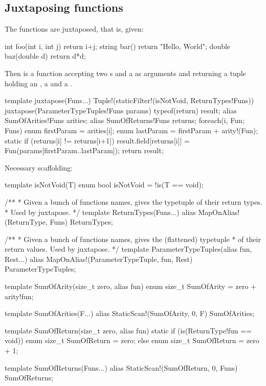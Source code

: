 \subsection{Juxtaposing functions}\label{juxtapose}


The functions are juxtaposed, that is, given:

\begin{dcode}
int foo(int i, int j) { return i+j;}
string bar() { return "Hello, World";}
double baz(double d) { return d*d;}
\end{dcode}

Then  is a function accepting two s and a  as arguments and returning a tuple holding an , a  and a .

\begin{dcode}
template juxtapose(Funs...)
{
    Tuple!(staticFilter!(isNotVoid, ReturnTypes!Funs))
    juxtapose(ParameterTypeTuples!Funs params) 
    {
        typeof(return) result;
        alias SumOfArities!Funs arities;
        alias SumOfReturns!Funs returns;
        foreach(i, Fun; Funs) 
        {
            enum firstParam = arities[i];
            enum lastParam = firstParam + arity!(Fun);
            static if (returns[i] != returns[i+1])
                result.field[returns[i]] = Fun(params[firstParam..lastParam]);
        }
        return result;
    }
}
\end{dcode}

Necessary scaffolding:

\begin{dcode}
template isNotVoid(T)
{
    enum bool isNotVoid = !is(T == void);
}

/** 
 * Given a bunch of functions names, gives the typetuple of their return types.
 * Used by juxtapose.
 */
template ReturnTypes(Funs...)
{
    alias MapOnAlias!(ReturnType, Funs) ReturnTypes;
}

/**
 * Given a bunch of functions names, gives the (flattened) typetuple
 * of their return values. Used by juxtapose.
 */
template ParameterTypeTuples(alias fun, Rest...)
{
    alias MapOnAlias!(ParameterTypeTuple, fun, Rest) ParameterTypeTuples;
}

template SumOfArity(size_t zero, alias fun)
{
    enum size_t SumOfArity = zero + arity!fun;
}

template SumOfArities(F...)
{
    alias StaticScan!(SumOfArity, 0, F) SumOfArities;
}

template SumOfReturn(size_t zero, alias fun)
{
    static if (is(ReturnType!fun == void))
        enum size_t SumOfReturn = zero;
    else
        enum size_t SumOfReturn = zero + 1;
}

template SumOfReturns(Funs...)
{
    alias StaticScan!(SumOfReturn, 0, Funs) SumOfReturns;
}
\end{dcode}

